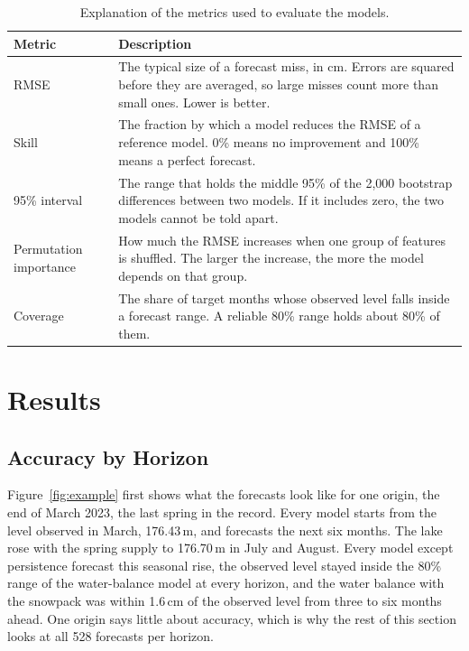 \documentclass{article}
\begin{document}
\begin{table}[htbp]
\centering
\caption{Explanation of the metrics used to evaluate the models.}
\label{tab:metrics}
\begin{tabular}{||l|p{}||}
\hline\hline
Metric & Description \\
\hline\hline
RMSE & The typical size of a forecast miss, in cm. Errors are squared before they are averaged,
so large misses count more than small ones. Lower is better. \\
Skill & The fraction by which a model reduces the RMSE of a reference model. 0\% means no
improvement and 100\% means a perfect forecast. \\
95\% interval & The range that holds the middle 95\% of the 2,000 bootstrap differences between
two models. If it includes zero, the two models cannot be told apart. \\
Permutation importance & How much the RMSE increases when one group of features is shuffled. The
larger the increase, the more the model depends on that group. \\
Coverage & The share of target months whose observed level falls inside a forecast range. A
reliable 80\% range holds about 80\% of them. \\
\hline\hline
\end{tabular}
\end{table}

\section{Results}
\label{sec:results}

\subsection{Accuracy by Horizon}

Figure~\ref{fig:example} first shows what the forecasts look like for one origin, the end of
March 2023, the last spring in the record. Every model starts from the level observed in March,
176.43\,m, and forecasts the next six months. The lake rose with the spring supply to
176.70\,m in July and August. Every model except persistence forecast this seasonal rise, the
observed level stayed inside the 80\% range of the water-balance model at every horizon, and the
water balance with the snowpack was within 1.6\,cm of the observed level from three to six months
ahead. One origin says little about accuracy, which is why the rest of this section looks at all
528 forecasts per horizon.
\end{document}
